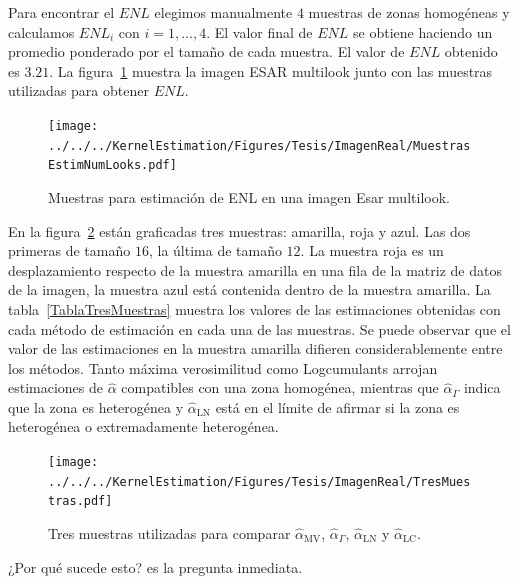 Para encontrar el $ENL$ elegimos manualmente $4$ muestras de zonas homogéneas y calculamos $ENL_i$ con $i=1,\ldots,4$. El valor final de $ENL$ se obtiene haciendo un promedio ponderado por el tamaño de cada muestra. El valor de $ENL$ obtenido es $3.21$. La figura~\ref{MuestraLooks} muestra la imagen ESAR multilook junto con las muestras utilizadas para obtener $ENL$.

\begin{figure}[htb]
	\centering
	\texttt{[image: ../../../KernelEstimation/Figures/Tesis/ImagenReal/MuestrasEstimNumLooks.pdf]}
	\caption{\label{MuestraLooks}\small Muestras para estimación de ENL en una imagen Esar multilook.}
\end{figure}

En la figura~\ref{TresMuestras} están graficadas tres muestras: amarilla, roja y azul. Las dos primeras de tamaño $16$, la última de tamaño $12$. La muestra roja es un desplazamiento respecto de la muestra amarilla en una fila de la matriz de datos de la imagen, la muestra azul está contenida dentro de la muestra amarilla. La tabla~\ref{TablaTresMuestras} muestra los valores de las estimaciones obtenidas con cada método de estimación en cada una de las muestras. Se puede observar que  el valor de las estimaciones en la muestra amarilla difieren considerablemente entre los métodos. Tanto máxima verosimilitud como Logcumulants arrojan estimaciones de $\widehat{\alpha}$ compatibles con una zona homogénea, mientras que $\widehat{\alpha}_{\Gamma}$ indica que la zona es heterogénea y $\widehat{\alpha}_{\text{LN}}$ está en el límite de afirmar si la zona es heterogénea o extremadamente heterogénea.
\begin{figure}[htb]
	\centering
	\texttt{[image: ../../../KernelEstimation/Figures/Tesis/ImagenReal/TresMuestras.pdf]}
	\caption{\label{TresMuestras}\small Tres muestras utilizadas para comparar  $\widehat{\alpha}_{\text{MV}}$, $\widehat{\alpha}_{\Gamma}$, $\widehat{\alpha}_{\text{LN}}$ y  $\widehat{\alpha}_{\text{LC}}$.}
\end{figure}

¿Por qué sucede esto? es la pregunta inmediata. 

